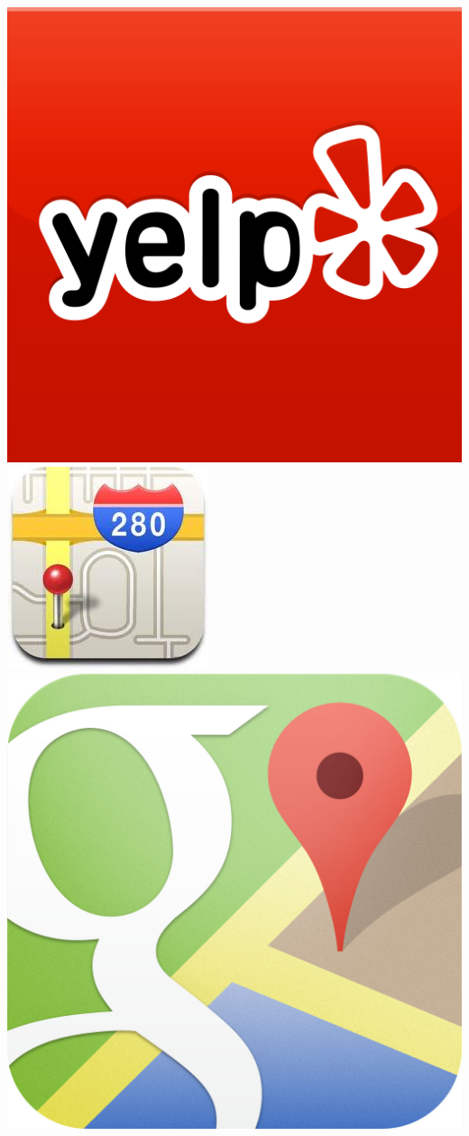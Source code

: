 \documentclass[a2,landscape]{a0poster}
\begin{document}
\begin{itemize}
\begin{center}
	\includegraphics[scale=0.08]{plots/logo_yelp}   
	\includegraphics[scale=0.35]{plots/logo_apple_maps}
   \includegraphics[scale=0.08]{plots/logo_google_maps}

\end{center}
\end{itemize}
\end{document}
